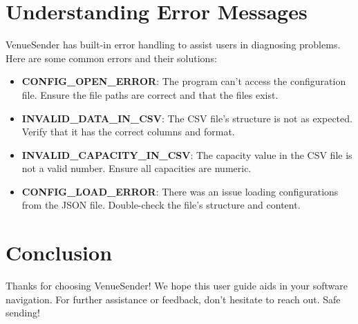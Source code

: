 \documentclass{article}
\begin{document}
	\section*{Understanding Error Messages}
	VenueSender has built-in error handling to assist users in diagnosing problems. Here are some common errors and their solutions:
	\begin{itemize}
		\item \textbf{CONFIG\_OPEN\_ERROR}: The program can't access the configuration file. Ensure the file paths are correct and that the files exist.
		\item \textbf{INVALID\_DATA\_IN\_CSV}: The CSV file's structure is not as expected. Verify that it has the correct columns and format.
		\item \textbf{INVALID\_CAPACITY\_IN\_CSV}: The capacity value in the CSV file is not a valid number. Ensure all capacities are numeric.
		\item \textbf{CONFIG\_LOAD\_ERROR}: There was an issue loading configurations from the JSON file. Double-check the file's structure and content.
	\end{itemize}
	
	\section*{Conclusion}
	Thanks for choosing VenueSender! We hope this user guide aids in your software navigation. For further assistance or feedback, don't hesitate to reach out. Safe sending!
	
\end{document}
